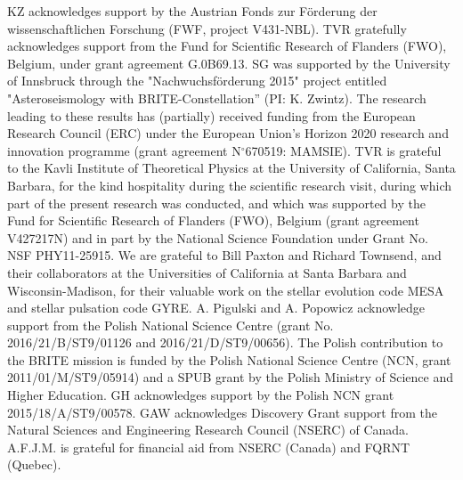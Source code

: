 \documentclass{aa}
\begin{document}
\begin{acknowledgements}
KZ acknowledges support by the Austrian Fonds zur F\"orderung der wissenschaftlichen Forschung (FWF, project V431-NBL).  TVR gratefully acknowledges support from the Fund for Scientific Research of Flanders (FWO), Belgium, under grant agreement G.0B69.13. SG was supported by the University of Innsbruck through the "Nachwuchsf\"orderung 2015" project entitled "Asteroseismology with BRITE-Constellation'' (PI: K. Zwintz). The research leading to these results has (partially) received funding from the European Research Council (ERC) under the European Union’s Horizon 2020 research and innovation programme (grant agreement N$^\circ$670519: MAMSIE). TVR is grateful to the Kavli Institute of Theoretical Physics at the University of California, Santa Barbara, for the kind hospitality during the scientific research visit, during which part of the present research was conducted, and which was supported by the Fund for Scientific Research of Flanders (FWO), Belgium (grant agreement V427217N) and in part by the National Science Foundation under Grant No. NSF PHY11-25915. We are grateful to Bill Paxton and Richard Townsend, and their collaborators at the Universities of California at Santa Barbara and Wisconsin-Madison, for their valuable work on the stellar evolution code MESA and stellar pulsation code GYRE.
A. Pigulski and A. Popowicz acknowledge support from the Polish National Science Centre (grant No. 2016/21/B/ST9/01126 and 2016/21/D/ST9/00656). The Polish contribution to the BRITE mission is funded by the Polish National Science Centre (NCN, grant 2011/01/M/ST9/05914) and a SPUB grant by the Polish Ministry of Science and Higher Education. GH acknowledges support by the Polish NCN grant 2015/18/A/ST9/00578.
GAW acknowledges Discovery Grant support from the Natural Sciences and Engineering Research Council (NSERC) of Canada. A.F.J.M. is grateful for financial aid from NSERC (Canada) and FQRNT (Quebec). 
\end{acknowledgements}





\end{document}

